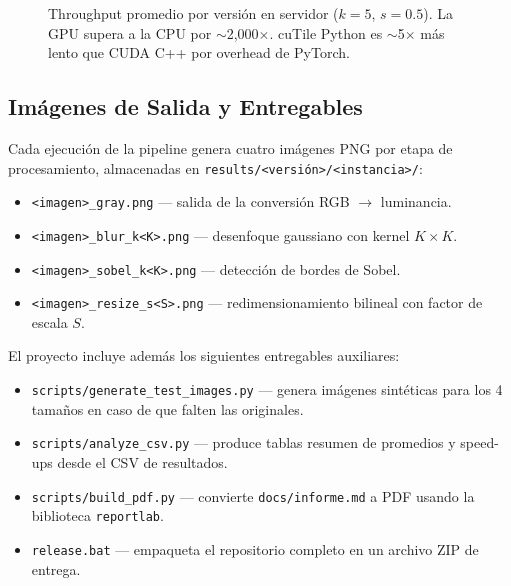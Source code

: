 \documentclass[12pt,a4paper]{article}
\begin{document}
\begin{figure}[H]
\centering
{}
\caption{Throughput promedio por versi\'on en servidor ($k=5$, $s=0.5$). La GPU supera a la CPU por $\sim$2,000$\times$. cuTile Python es $\sim$5$\times$ m\'as lento que CUDA C++ por overhead de PyTorch.}
\label{fig:throughput}
\end{figure}

\subsection{Im\'agenes de Salida y Entregables}

Cada ejecuci\'on de la pipeline genera cuatro im\'agenes PNG por etapa de procesamiento, almacenadas en \texttt{results/<versi\'on>/<instancia>/}:

\begin{itemize}
  \item \texttt{<imagen>\_gray.png} --- salida de la conversi\'on RGB $\rightarrow$ luminancia.
  \item \texttt{<imagen>\_blur\_k<K>.png} --- desenfoque gaussiano con kernel $K \times K$.
  \item \texttt{<imagen>\_sobel\_k<K>.png} --- detecci\'on de bordes de Sobel.
  \item \texttt{<imagen>\_resize\_s<S>.png} --- redimensionamiento bilineal con factor de escala $S$.
\end{itemize}

El proyecto incluye adem\'as los siguientes entregables auxiliares:

\begin{itemize}
  \item \texttt{scripts/generate\_test\_images.py} --- genera im\'agenes sint\'eticas para los 4 tama\~nos en caso de que falten las originales.
  \item \texttt{scripts/analyze\_csv.py} --- produce tablas resumen de promedios y speed-ups desde el CSV de resultados.
  \item \texttt{scripts/build\_pdf.py} --- convierte \texttt{docs/informe.md} a PDF usando la biblioteca \texttt{reportlab}.
  \item \texttt{release.bat} --- empaqueta el repositorio completo en un archivo ZIP de entrega.
\end{itemize}
\end{document}
